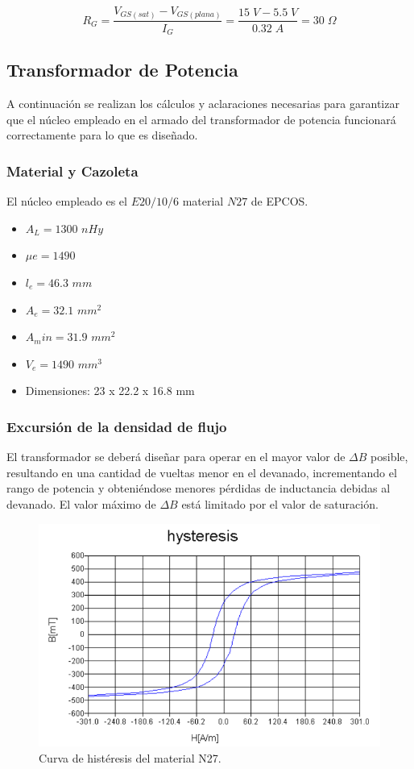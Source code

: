 \documentclass[11pt, a4paper]{article}
\begin{document}
\[ R_G = \frac{V_{GS(sat)} - V_{GS(plana)}}{I_G} = \frac{15 \; V - 5.5 \; V}{0.32 \; A} = 30 \; \Omega  \]

\subsection{Transformador de Potencia}
A continuación se realizan los cálculos y aclaraciones necesarias para garantizar que el núcleo empleado en el armado del transformador de potencia funcionará correctamente para lo que es diseñado.
\subsubsection{Material y Cazoleta}
El núcleo empleado es el $E20/10/6$ material $N27$ de EPCOS.
\begin{itemize}
	\item $A_L = 1300$ $nHy$
	\item $\mu e = 1490$
	\item $\mathit{l}_e = 46.3$ $mm$
	\item $A_e = 32.1$ $mm^2$
	\item $A_min = 31.9$ $mm^2$
	\item $V_e = 1490$ $mm^3$
	\item Dimensiones: 23 x 22.2 x 16.8 mm  
\end{itemize}
\subsubsection{Excursión de la densidad de flujo}
El transformador se deberá diseñar para operar en el mayor valor de $\Delta B$ posible, resultando en una cantidad de vueltas menor en el devanado, incrementando el rango de potencia y obteniéndose menores pérdidas de inductancia debidas al devanado. El valor máximo de $\Delta B$ está limitado por el valor de saturación.

\begin{figure}[h]
	\centering
	\includegraphics[width = 10 cm]{Imagenes/n27}
	\caption{Curva de histéresis del material N27.}
	\label{n27}
\end{figure}
\end{document}
